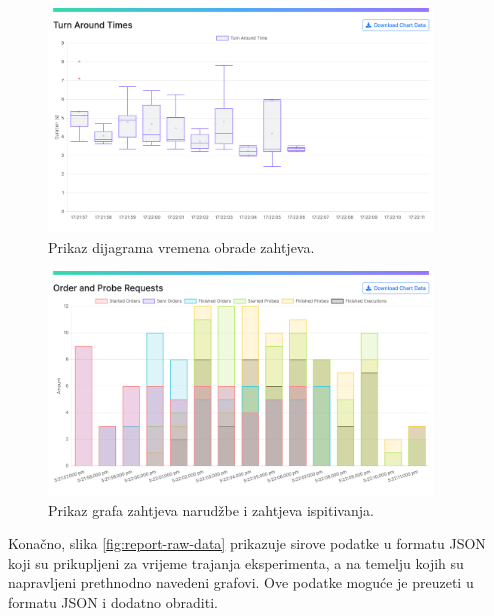 \documentclass[times, utf8, diplomski]{fer}
\begin{document}
\pagebreak

\begin{figure}[htb]
	\centering
	\includegraphics[width=0.91\textwidth]{images/Report UI 2.png}
	\caption{
		Prikaz dijagrama vremena obrade zahtjeva.
	}
	\label{fig:report-tat}
\end{figure}

\begin{figure}[htb]
	\centering
	\includegraphics[width=0.91\textwidth]{images/Report UI 3.png}
	\caption{
		Prikaz grafa zahtjeva narudžbe i zahtjeva ispitivanja.
	}
	\label{fig:report-requests}
\end{figure}

\pagebreak

Konačno, slika \ref{fig:report-raw-data} prikazuje sirove podatke u formatu JSON koji su prikupljeni za vrijeme trajanja eksperimenta, a na temelju kojih su napravljeni prethnodno navedeni grafovi. Ove podatke moguće je preuzeti u formatu JSON i dodatno obraditi.
\end{document}
